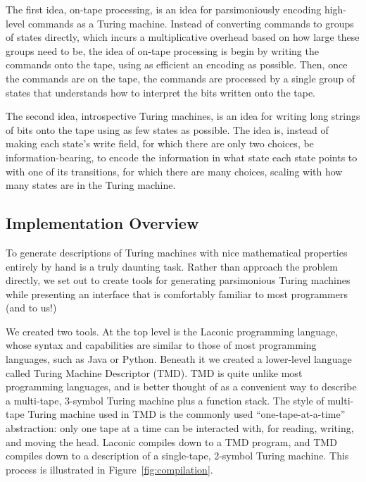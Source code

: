 \documentclass[11pt]{article}
\begin{document}
The first idea, on-tape processing, is an idea for parsimoniously encoding high-level commands as a Turing machine. Instead of converting commands to groups of states directly, which incurs a multiplicative overhead based on how large these groups need to be, the idea of on-tape processing is begin by writing the commands onto the tape, using as efficient an encoding as possible. Then, once the commands are on the tape, the commands are processed by a single group of states that understands how to interpret the bits written onto the tape.

The second idea, introspective Turing machines, is an idea for writing long strings of bits onto the tape using as few states as possible. The idea is, instead of making each state's write field, for which there are only two choices, be information-bearing, to encode the information in what state each state points to with one of its transitions, for which there are many choices, scaling with how many states are in the Turing machine.

\subsection{Implementation Overview}

To generate descriptions of Turing machines with nice mathematical properties entirely by hand is a truly daunting task. Rather than approach the problem directly, we set out to create tools for generating parsimonious Turing machines while presenting an interface that is comfortably familiar to most programmers (and to us!) 

We created two tools. At the top level is the Laconic programming language, whose syntax and capabilities are similar to those of most programming languages, such as Java or Python. Beneath it we created a lower-level language called Turing Machine Descriptor (TMD). TMD is quite unlike most programming languages, and is better thought of as a convenient way to describe a multi-tape, 3-symbol Turing machine plus a function stack. The style of multi-tape Turing machine used in TMD is the commonly used ``one-tape-at-a-time'' abstraction: only one tape at a time can be interacted with, for reading, writing, and moving the head. Laconic compiles down to a TMD program, and TMD compiles down to a description of a single-tape, 2-symbol Turing machine. This process is illustrated in Figure~\ref{fig:compilation}. 
\end{document}
